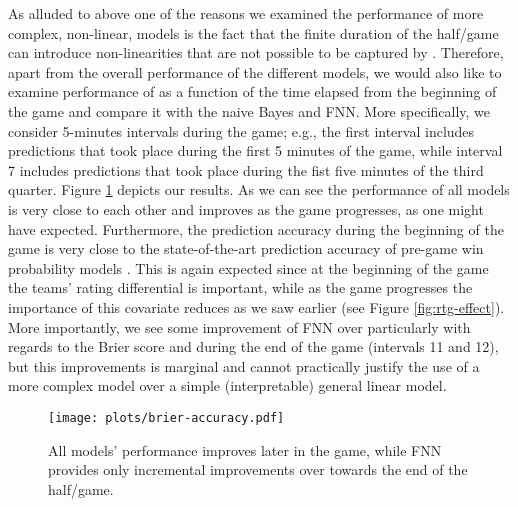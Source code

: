 \documentclass{sig-alternate}
\begin{document}
As alluded to above one of the reasons we examined the performance of more complex, non-linear, models is the fact that the finite duration of the half/game can introduce non-linearities that are not possible to be captured by {\method}. 
Therefore, apart from the overall performance of the different models, we would also like to examine performance of {\method} as a function of the time elapsed from the beginning of the game and compare it with the naive Bayes and FNN. 
More specifically, we consider 5-minutes intervals during the game; e.g., the first interval includes predictions that took place during the first 5 minutes of the game, while interval 7 includes predictions that took place during the fist five minutes of the third quarter. 
Figure \ref{fig:performance-time} depicts our results. 
As we can see the performance of all models is very close to each other and improves as the game progresses, as one might have expected. 
Furthermore, the prediction accuracy during the beginning of the game is very close to the state-of-the-art prediction accuracy of pre-game win probability models \cite{kpele-plosone}. 
This is again expected since at the beginning of the game the teams' rating differential is important, while as the game progresses the importance of this covariate reduces as we saw earlier (see Figure \ref{fig:rtg-effect}).  
More importantly, we see some improvement of FNN over {\method} particularly with regards to the Brier score and during the end of the game (intervals 11 and 12), but this improvements is marginal and cannot practically justify the use of a more complex model over a simple (interpretable) general linear model. 

\begin{figure}[t]
\begin{center}
\texttt{[image: plots/brier-accuracy.pdf]}%
 \caption{All models' performance improves later in the game, while FNN provides only incremental improvements over {\method} towards the end of the half/game.}
 \label{fig:performance-time}
\end{center}
\end{figure}
\end{document}
